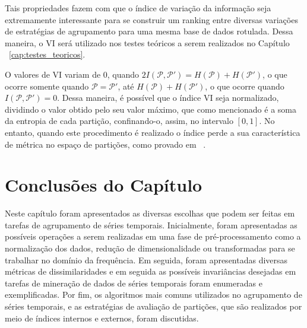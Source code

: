 Tais propriedades fazem com que o índice de variação da informação seja extremamente interessante para se construir um ranking entre diversas variações de estratégias de agrupamento para uma mesma base de dados rotulada. Dessa maneira, o VI será utilizado nos testes teóricos a serem realizados no Capítulo ~\ref{cap:testes_teoricos}.

O valores de VI variam de 0, quando $2I(\mathcal{P},\mathcal{P'})=H(\mathcal{P}) + H(\mathcal{P'})$, o que ocorre somente quando $\mathcal{P}=\mathcal{P'}$, até $H(\mathcal{P}) + H(\mathcal{P'})$, o que ocorre quando $I(\mathcal{P},\mathcal{P'}) =0$. Dessa maneira, é possível que o índice VI seja normalizado, dividindo o valor obtido pelo seu valor máximo, que como mencionado é a soma da entropia de cada partição, confinando-o, assim, no intervalo $[0,1]$. No entanto, quando este procedimento é realizado o índice perde a sua característica de métrica no espaço de partições, como provado em ~\parencite{Meila}.




\section{Conclusões do Capítulo}

Neste capítulo foram apresentados as diversas escolhas que podem ser feitas em tarefas de agrupamento de séries temporais. Inicialmente, foram apresentadas as possíveis operações a serem realizadas em uma fase de pré-processamento como a normalização dos dados, redução de dimensionalidade ou transformadas para se trabalhar no domínio da frequência. Em seguida, foram apresentadas diversas métricas de dissimilaridades e em seguida as possíveis invariâncias desejadas em tarefas de mineração de dados de séries temporais foram enumeradas e exemplificadas. Por fim, os algoritmos mais comuns utilizados no agrupamento de séries temporais, e as estratégias de avaliação de partições, que são realizados por meio de índices internos e externos, foram discutidas.

